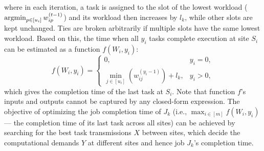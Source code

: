 where in each iteration, a task is assigned to the slot of the lowest workload ($\operatorname*{argmin}_{p \in [u_i]} w_{ip}^{(t-1)}$) and its workload then increases by $l_k$, while other slots are kept unchanged. Ties are broken arbitrarily if multiple slots have the same lowest workload.
Based on this, the time when all $y_i$ tasks complete execution at site $S_i$ can be estimated as a function $f(W_i, y_i)$:
\[
f(W_i, y_i) =
\begin{cases}
0, & y_i = 0, \\
\min_{j \in [u_i]}(w_{ij}^{(y_i-1)})+l_k,  & y_i > 0,
\end{cases}
\]
which gives the completion time of the last task at $S_i$.
Note that function $f$'s inputs and outputs cannot be captured by any closed-form expression. %
The objective of optimizing the job completion time of $J_k$ (i.e., $\max_{i \in [m]} f(W_i,y_i)$ --- the completion time of its last task across all sites) can be achieved by searching for the best task transmissions $X$ between sites, which decide the computational demands $Y$ at different sites and hence job $J_k$'s completion time. 


